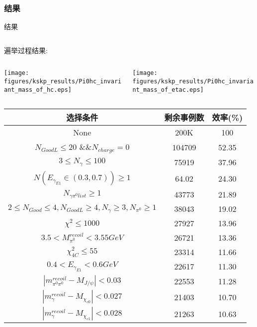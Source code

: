\documentclass{beamer}
\begin{document}
\subsubsection{结果}
\begin{frame}{结果}
\begin{columns}[c]
\begin{column}{0.7\textwidth}
遍举过程结果:\\
    \begin{columns}[c]
    \begin{column}{0.45\textwidth}
\texttt{[image: figures/kskp\_results/Pi0hc\_invariant\_mass\_of\_hc.eps]}\\
        \end{column}
    \begin{column}{0.45\textwidth}
\texttt{[image: figures/kskp\_results/Pi0hc\_invariant\_mass\_of\_etac.eps]}\\
        \end{column}
        \end{columns}
        \vskip -0.5cm
\begin{table}[htbp]
\begin{center}
\begin{tiny}
\begin{tabular}{c|c|c}\hline\hline
选择条件& 剩余事例数& 效率(\%) \\
        \hline
None & 200K &  100 \\
$N_{GoodL}\le20$ \&\&$N_{charge}=0$ & 104709 & 52.35\\
$3\le N_{\gamma}\le100$ &75919 & 37.96 \\
$N(E_{\gamma_{E1}}\in(0.3,0.7))\ge 1$ & 64.02 & 24.30 \\
$N_{\gamma\pi^0 list}\ge 1$ & 43773 & 21.89 \\
$2\le N_{Good}\le 4,N_{GoodL}\ge 4,N_{\gamma}\ge 3,N_{\pi^0}\ge 1$ & 38043 & 19.02 \\
$\chi^2\le 1000$ & 27927 & 13.96 \\
$3.5<M^{recoil}_{\pi^0}<3.55 GeV$ & 26721  & 13.36\\
$\chi^2_{4C}\le 55$ & 23314 & 11.66\\
$0.4<E_{\gamma_{E1}}<0.6 GeV $ &22617  & 11.30 \\
$|m^{recoil}_{\pi^0 \pi^0}-M_{J/\psi}|<0.03$ & 22553  & 11.28 \\
$|m^{recoil}_{\gamma}-M_{\chi_{c0}}|<0.027$ & 21403 & 10.70 \\
$|m^{recoil}_{\gamma}-M_{\chi_{c1}}|<0.028$ &21263  & 10.63\\

\end{tabular}
\end{tiny}
\end{center}
\end{table}
\end{column}
\end{columns}
\end{frame}
\end{document}
